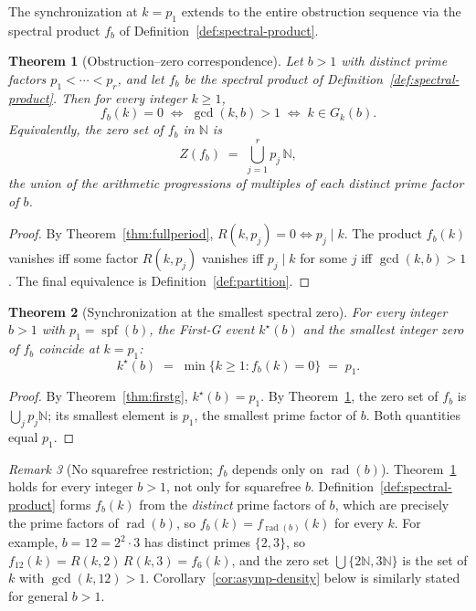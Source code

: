 \documentclass[11pt,reqno]{amsart}
\theoremstyle{plain}
\newtheorem{theorem}{Theorem}[section]
\theoremstyle{definition}
\theoremstyle{remark}
\newtheorem{remark}[theorem]{Remark}
\DeclareMathOperator{\spf}{spf}
\DeclareMathOperator{\rad}{rad}
\newcommand{\N}{\mathbb{N}}
\begin{document}
The synchronization at $k = p_{1}$ extends to the entire obstruction
sequence via the spectral product $f_{b}$ of
Definition~\ref{def:spectral-product}.

\begin{theorem}[Obstruction--zero correspondence]\label{thm:obstruction-zero}
Let $b > 1$ with distinct prime factors $p_{1} < \cdots < p_{r}$,
and let $f_{b}$ be the spectral product of
Definition~\ref{def:spectral-product}. Then for every integer
$k \ge 1$,
\begin{equation}\label{eq:obstruction-zero}
  f_{b}(k) = 0
  \;\Longleftrightarrow\;
  \gcd(k, b) > 1
  \;\Longleftrightarrow\;
  k \in G_{k}(b).
\end{equation}
Equivalently, the zero set of $f_{b}$ in $\N$ is
\[
  Z(f_{b}) \;=\; \bigcup_{j=1}^{r} p_{j}\,\N,
\]
the union of the arithmetic progressions of multiples of each
distinct prime factor of $b$.
\end{theorem}

\begin{proof}
By Theorem~\ref{thm:fullperiod}, $R(k, p_{j}) = 0 \Leftrightarrow
p_{j} \mid k$. The product $f_{b}(k)$ vanishes iff some factor
$R(k, p_{j})$ vanishes iff $p_{j} \mid k$ for some $j$ iff
$\gcd(k, b) > 1$. The final equivalence is Definition~\ref{def:partition}.
\end{proof}

\begin{theorem}[Synchronization at the smallest spectral zero]\label{thm:sync}
For every integer $b > 1$ with $p_{1} = \spf(b)$, the First-G event
$k^{\star}(b)$ and the smallest integer zero of $f_{b}$ coincide at
$k = p_{1}$:
\[
  k^{\star}(b)
  \;=\;
  \min\{k \ge 1 : f_{b}(k) = 0\}
  \;=\;
  p_{1}.
\]
\end{theorem}

\begin{proof}
By Theorem~\ref{thm:firstg}, $k^{\star}(b) = p_{1}$. By
Theorem~\ref{thm:obstruction-zero}, the zero set of $f_{b}$ is
$\bigcup_{j} p_{j} \N$; its smallest element is $p_{1}$, the smallest
prime factor of $b$. Both quantities equal $p_{1}$.
\end{proof}

\begin{remark}[No squarefree restriction; $f_{b}$ depends only on $\rad(b)$]\label{rem:radical}
Theorem~\ref{thm:obstruction-zero} holds for every integer $b > 1$,
not only for squarefree $b$. Definition~\ref{def:spectral-product}
forms $f_{b}(k)$ from the \emph{distinct} prime factors of $b$, which
are precisely the prime factors of $\rad(b)$, so
$f_{b}(k) = f_{\rad(b)}(k)$ for every $k$. For example,
$b = 12 = 2^{2} \cdot 3$ has distinct primes $\{2, 3\}$, so
$f_{12}(k) = R(k, 2)\, R(k, 3) = f_{6}(k)$, and the zero set
$\bigcup\{2\N, 3\N\}$ is the set of $k$ with $\gcd(k, 12) > 1$.
Corollary~\ref{cor:asymp-density} below is similarly stated for
general $b > 1$.
\end{remark}
\end{document}

